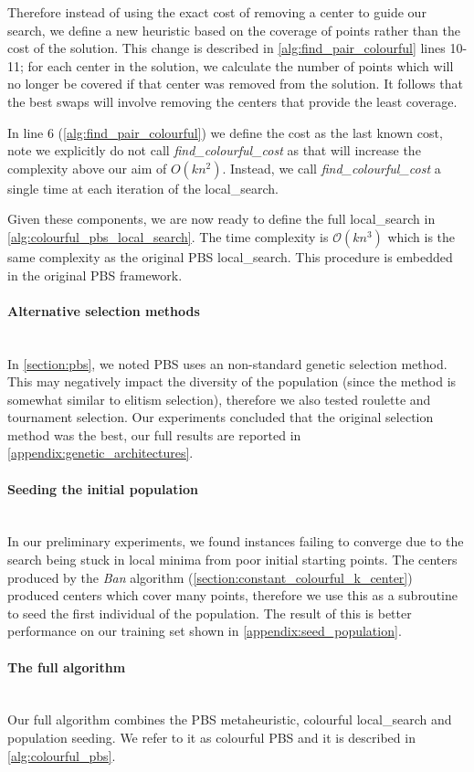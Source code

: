 Therefore instead of using the exact cost of removing a center to guide our search, we define a new heuristic based on the coverage of points rather than the cost of the solution. This change is described in \cref{alg:find_pair_colourful} lines 10-11; for each center in the solution, we calculate the number of points which will no longer be covered if that center was removed from the solution. It follows that the best swaps will involve removing the centers that provide the least coverage.



In line 6 (\cref{alg:find_pair_colourful}) we define the cost as the last known cost, note we explicitly do not call \emph{find\_colourful\_cost} as that will increase the complexity above our aim of ${O}(kn^2)$. Instead, we call \emph{find\_colourful\_cost} a single time at each iteration of the \gls{local_search}.

Given these components, we are now ready to define the full \gls{local_search} in \cref{alg:colourful_pbs_local_search}. The time complexity is $\mathcal{O}(kn^3)$ which is the same complexity as the original PBS \gls{local_search}. This procedure is embedded in the original PBS framework.



\paragraph{Alternative selection methods}~\\
In \cref{section:pbs}, we noted PBS uses an non-standard genetic selection method. This may negatively impact the diversity of the population (since the method is somewhat similar to elitism selection), therefore we also tested roulette and tournament selection. Our experiments concluded that the original selection method was the best, our full results are reported in \cref{appendix:genetic_architectures}.

\paragraph{Seeding the initial population}~\\
In our preliminary experiments, we found instances failing to converge due to the search being stuck in local minima from poor initial starting points. The centers produced by the \emph{Ban} algorithm (\cref{section:constant_colourful_k_center}) produced centers which cover many points, therefore we use this as a subroutine to seed the first individual of the population. The result of this is better performance on our training set shown in \cref{appendix:seed_population}.

\paragraph{The full algorithm}~\\
Our full algorithm combines the PBS metaheuristic, colourful \gls{local_search} and population seeding. We refer to it as colourful PBS and it is described in \cref{alg:colourful_pbs}.

